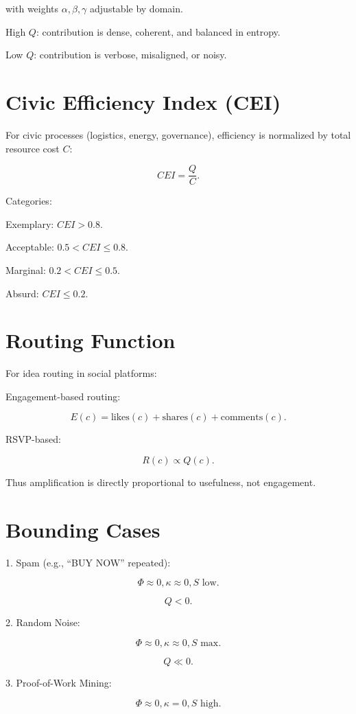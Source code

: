 \documentclass{book}
\begin{document}
with weights \( \alpha, \beta, \gamma \) adjustable by domain.

High \( Q \): contribution is dense, coherent, and balanced in entropy.

Low \( Q \): contribution is verbose, misaligned, or noisy.

\section{Civic Efficiency Index (CEI)}

For civic processes (logistics, energy, governance), efficiency is normalized by total resource cost \( C \):

\[ CEI = \frac{Q}{C}. \]

Categories:

Exemplary: \( CEI > 0.8 \).

Acceptable: \( 0.5 < CEI \leq 0.8 \).

Marginal: \( 0.2 < CEI \leq 0.5 \).

Absurd: \( CEI \leq 0.2 \).

\section{Routing Function}

For idea routing in social platforms:

Engagement-based routing:

\[ E(c) = \text{likes}(c) + \text{shares}(c) + \text{comments}(c). \]

RSVP-based:

\[ R(c) \propto Q(c). \]

Thus amplification is directly proportional to usefulness, not engagement.

\section{Bounding Cases}

1. Spam (e.g., “BUY NOW” repeated):

\[ \Phi \approx 0, \kappa \approx 0, S \text{ low}. \]

\[ Q < 0. \]

2. Random Noise:

\[ \Phi \approx 0, \kappa \approx 0, S \text{ max}. \]

\[ Q \ll 0. \]

3. Proof-of-Work Mining:

\[ \Phi \approx 0, \kappa = 0, S \text{ high}. \]
\end{document}
